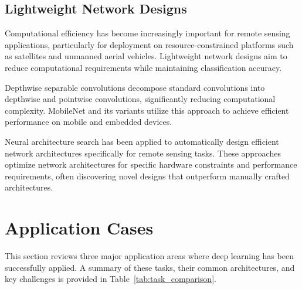 \documentclass[12pt,a4paper]{article}
\begin{document}
\subsection{Lightweight Network Designs}
Computational efficiency has become increasingly important for remote sensing applications, particularly for deployment on resource-constrained platforms such as satellites and unmanned aerial vehicles. Lightweight network designs aim to reduce computational requirements while maintaining classification accuracy.

Depthwise separable convolutions decompose standard convolutions into depthwise and pointwise convolutions, significantly reducing computational complexity. MobileNet and its variants utilize this approach to achieve efficient performance on mobile and embedded devices.

Neural architecture search has been applied to automatically design efficient network architectures specifically for remote sensing tasks. These approaches optimize network architectures for specific hardware constraints and performance requirements, often discovering novel designs that outperform manually crafted architectures.

\section{Application Cases}
\label{sec:applications}

This section reviews three major application areas where deep learning has been successfully applied. A summary of these tasks, their common architectures, and key challenges is provided in Table~\ref{tab:task_comparison}.

\begin{table}[h!]
\centering
\caption{Comparison of Major Deep Learning Tasks in Remote Sensing.}
\label{tab:task_comparison}
\end{table}
\end{document}
